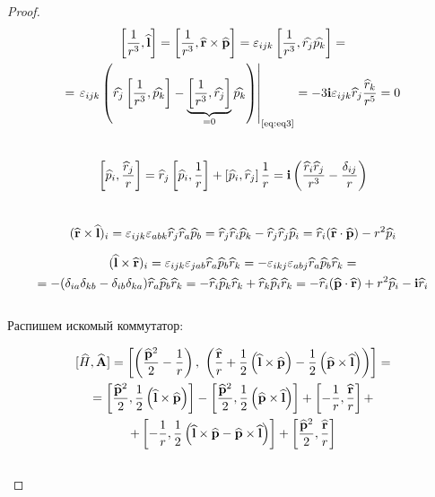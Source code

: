 \begin{proof}
\begin{equation}
\label{eq:eq4}
\begin{gathered}
\left [ {\frac{1}{r^3}, \widehat{\mathbf{l}}} \right ] = \left [ {\frac{1}{r^3}, \widehat{\mathbf{r}} \times \widehat{\mathbf{p}}} \right ] = \varepsilon_{ijk} \left [ { \frac{1}{r^3}, \widehat{r_j}\widehat{p_k} } \right ] = \\ = 
\left. \varepsilon_{ijk} \left ( { \widehat{r_j} \left [ { \frac{1}{r^3}, \widehat{p_k} } \right ] - \underbrace { \left [ { \frac{1}{r^3}, \widehat{r_j} } \right ] }_{=0} \widehat{p_k} } \right ) \right|_{\text{\eqref{eq:eq3}}} =
-3 \mathbf{i} \varepsilon_{ijk} \widehat{r}_j \frac{\widehat{r}_k}{r^5} = 0
\end{gathered}
\end{equation}\\

\begin{equation}
\label{eq:eq6}
\left [ {\widehat{p}_i, \frac{\widehat{r}_j}{r}} \right ] = \widehat{r}_j \left [ {\widehat{p}_i, \frac{1}{r}} \right ] + \left [ {\widehat{p}_i, \widehat{r}_j} \right ] \frac{1}{r} = \mathbf{i} \left ( {\frac{\widehat{r}_i\widehat{r}_j}{r^3}-\frac{\delta_{ij}}{r}} \right )
\end{equation}\\

\begin{equation}
\label{eq:eq7}
(\widehat{\mathbf{r}} \times \widehat{\mathbf{l}})_i = \varepsilon_{ijk}\varepsilon_{abk} \widehat{r}_j \widehat{r}_a \widehat{p}_b = \widehat{r}_j \widehat{r}_i \widehat{p}_k - \widehat{r}_j \widehat{r}_j \widehat{p}_i = \widehat{r}_i (\widehat{\mathbf{r}} \cdot \widehat{\mathbf{p}}) - r^2 \widehat{p}_i
\end{equation}

\begin{equation}
\label{eq:eq8}
\begin{gathered}
(\widehat{\mathbf{l}} \times \widehat{\mathbf{r}})_i = \varepsilon_{ijk}\varepsilon_{jab} \widehat{r}_a \widehat{p}_b \widehat{r}_k = - \varepsilon_{ikj}\varepsilon_{abj} \widehat{r}_a \widehat{p}_b \widehat{r}_k = \\ = 
- (\delta_{ia}\delta_{kb} - \delta_{ib}\delta_{ka}) \widehat{r}_a \widehat{p}_b \widehat{r}_k = - \widehat{r}_i \widehat{p}_k \widehat{r}_k + \widehat{r}_k \widehat{p}_i \widehat{r}_k =
- \widehat{r}_i (\widehat{\mathbf{p}} \cdot \widehat{\mathbf{r}}) + r^2 \widehat{p}_i - \mathbf{i} \widehat{r}_i
\end{gathered}
\end{equation}\\

Распишем искомый коммутатор:

$$
\begin{gathered}
{[\widehat{H},\widehat{\mathbf{A}}]} =  \left [ { \left ( {\frac{\widehat{\mathbf{p}}^2}{2}-\frac{1}{r}} \right ) ,~  \left ( {\frac{\widehat{\mathbf{r}}}{r} + \frac{1}{2} \left ( {\widehat{\mathbf{l}} \times \widehat{\mathbf{p}}} \right ) - \frac{1}{2} \left ( { \widehat{\mathbf{p}} \times \widehat{\mathbf{l}}} \right )} \right ) } \right ] = \\ =
\left [ {\frac{\widehat{\mathbf{p}}^2}{2}, \frac{1}{2} \left ( {\widehat{\mathbf{l}} \times \widehat{\mathbf{p}}} \right )} \right ] - 
\left [ {\frac{\widehat{\mathbf{p}}^2}{2}, \frac{1}{2} \left ( {\widehat{\mathbf{p}} \times \widehat{\mathbf{l}}} \right )} \right ] +
\left [ {-\frac{1}{r}, \frac{\widehat{\mathbf{r}}}{r}} \right ] + \\ +
\left [ {-\frac{1}{r}, \frac{1}{2} \left ( {\widehat{\mathbf{l}} \times \widehat{\mathbf{p}} - \widehat{\mathbf{p}} \times \widehat{\mathbf{l}}} \right )} \right ] +
\left [ {\frac{\widehat{\mathbf{p}}^2}{2}, \frac{\widehat{\mathbf{r}}}{r}} \right ]
\end{gathered}
$$\\


\end{proof}
